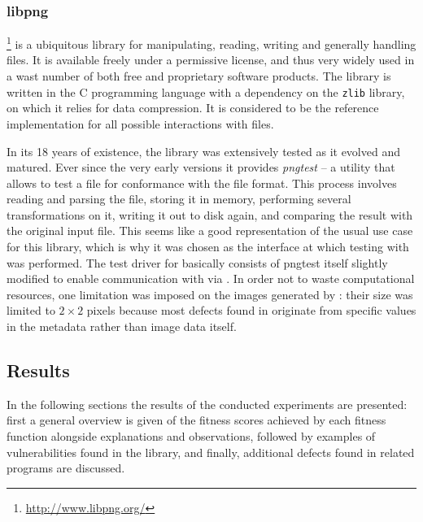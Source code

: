 \tocless\subsubsection{libpng}
\libpng\footnote{\url{http://www.libpng.org/}} is a ubiquitous library for manipulating, reading,
writing and generally handling \png files. It is available freely under a permissive license, and thus very
widely used in a wast number of both free and proprietary software products. The \libpng library is
written in the {\small C} programming language with a dependency on the \texttt{zlib} library, on which it
relies for data compression. It is considered to be the reference implementation for all possible interactions
with \png files.

In its 18 years of existence, the library was extensively tested as it evolved and matured. Ever since the very
early versions it provides \emph{pngtest} -- a utility that allows to test a \png file for conformance with the
\png file format. This process involves reading and parsing the file, storing it in memory, performing several
transformations on it, writing it out to disk again, and comparing the result with the original input file.
This seems like a good representation of the usual use case for this library, which is why it was chosen as
the interface at which testing with \xmlmate was performed. The test driver for \libpng basically
consists of pngtest itself slightly modified to enable communication with \xmlmate via \zmq. In order not
to waste computational resources, one limitation was imposed on the images generated by \xmlmate: their size
was limited to $2\times 2$ pixels because most defects found in \libpng originate from specific values
in the metadata rather than image data itself.

\subsection{Results}
In the following sections the results of the conducted experiments are presented: first a general overview is
given of the fitness scores achieved by each fitness function alongside explanations and observations,
followed by examples of vulnerabilities found in the \libpng library, and finally, additional defects found in
related programs are discussed.

